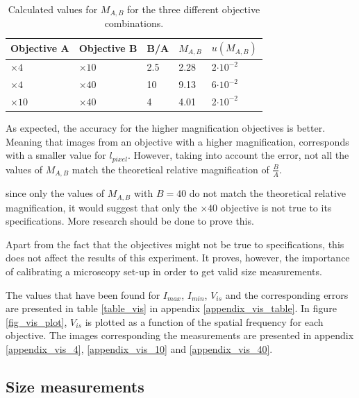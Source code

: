 \begin{table}[h!]


\centering
\captionsetup{font=small, justification = centering}
  \caption{Calculated values for $M_{A,B}$ for the three different objective combinations.}

\begin{tabular}{|l|l|l|l|l|}
\hline

Objective A & Objective B & B/A & $M_{A,B}$ & $u(M_{A,B})$ \\ \hline
$\times 4$ & $\times 10$ & 2.5 & 2.28 & 2$\cdot 10^{-2}$\\
$\times 4$& $\times 40$ & 10 & 9.13 & 6$\cdot 10^{-2}$ \\
$\times 10$ & $\times 40$ & 4 & 4.01 & 2$\cdot 10^{-2}$ \\ \hline
\end{tabular}


\label{table_magnification}
\end{table}

As expected, the accuracy for the higher magnification objectives is better. Meaning that images from an objective with a higher magnification, corresponds with a smaller value for $l_{pixel}$. However, taking into account the error, not all the values of $M_{A,B}$ match the theoretical relative magnification of $\frac{B}{A}$.

since only the values of $M_{A,B}$ with $B = 40$ do not match the theoretical relative magnification, it would suggest that only the $\times 40$ objective is not true to its specifications. More research should be done to prove this.

Apart from the fact that the objectives might not be true to specifications, this does not affect the results of this experiment. It proves, however, the importance of calibrating a microscopy set-up in order to get valid size measurements.

\bigskip


The values that have been found for $I_{max}$, $I_{min}$, $V_{is}$ and the corresponding errors are presented in table \ref{table_vis} in appendix \ref{appendix_vis_table}. In figure \ref{fig_vis_plot}, $V_{is}$ is plotted as a function of the spatial frequency for each objective. The images corresponding the measurements are presented in appendix \ref{appendix_vis_4}, \ref{appendix_vis_10} and \ref{appendix_vis_40}.



\subsection{Size measurements}

